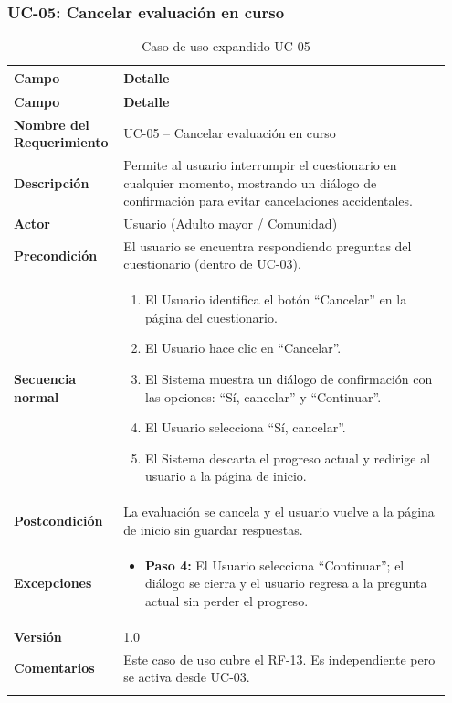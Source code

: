 \subsubsection{UC-05: Cancelar evaluación en curso}

\begin{longtable}{p{0.22\linewidth} p{0.73\linewidth}}
\toprule
\rowcolor{tableheader!20}
\textbf{Campo} & \textbf{Detalle} \\
\midrule
\endfirsthead
\rowcolor{tableheader!20}
\textbf{Campo} & \textbf{Detalle} \\
\midrule
\endhead
\bottomrule
\endfoot
\textbf{Nombre del Requerimiento} & UC-05 -- Cancelar evaluación en curso \\
\textbf{Descripción} & Permite al usuario interrumpir el cuestionario en cualquier momento, mostrando un diálogo de confirmación para evitar cancelaciones accidentales. \\
\textbf{Actor} & Usuario (Adulto mayor / Comunidad) \\
\textbf{Precondición} & El usuario se encuentra respondiendo preguntas del cuestionario (dentro de UC-03). \\
\textbf{Secuencia normal} & 
  \begin{enumerate}
    \item El Usuario identifica el botón ``Cancelar'' en la página del cuestionario.
    \item El Usuario hace clic en ``Cancelar''.
    \item El Sistema muestra un diálogo de confirmación con las opciones: ``Sí, cancelar'' y ``Continuar''.
    \item El Usuario selecciona ``Sí, cancelar''.
    \item El Sistema descarta el progreso actual y redirige al usuario a la página de inicio.
  \end{enumerate} \\
\textbf{Postcondición} & La evaluación se cancela y el usuario vuelve a la página de inicio sin guardar respuestas. \\
\textbf{Excepciones} & 
  \begin{itemize}
    \item \textbf{Paso 4:} El Usuario selecciona ``Continuar''; el diálogo se cierra y el usuario regresa a la pregunta actual sin perder el progreso.
  \end{itemize} \\
\textbf{Versión} & 1.0 \\
\textbf{Comentarios} & Este caso de uso cubre el RF-13. Es independiente pero se activa desde UC-03. \\
\bottomrule
\caption{Caso de uso expandido UC-05}
\label{tab:uc05}
\end{longtable}

